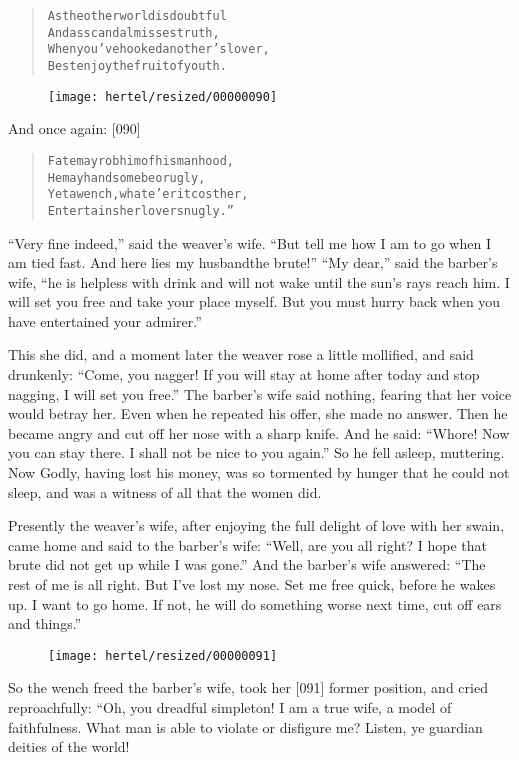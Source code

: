 \documentclass[article, twoside, 10pt]{memoir}
\renewenvironment{verbatim}{%
\begin{quote}%
\vskip -10pt%
\begin{alltt}\normalfont\small}{\end{alltt}%
\end{quote}%
\vskip -10pt
} %
\begin{document}
\begin{verbatim}
As the other world is doubtful
    And as scandal misses truth,
When you've hooked another's lover,
    Best enjoy the fruit of youth.
\end{verbatim}
\begin{figure}[p]\texttt{[image: hertel/resized/00000090]}\end{figure}And once again: [090]

\begin{verbatim}
Fate may rob him of his manhood,
He may handsome be or ugly,
Yet a wench, whate'er it cost her,
Entertains her lover snugly.”
\end{verbatim}
``Very fine indeed,'' said the weaver's wife.
``But tell me how I am to go when I am tied fast. And here lies my husband{\textemdash}the brute!''
``My dear,'' said the barber's wife,
``he is helpless with drink and will not wake until the sun's rays reach him. I will set you free and take your place myself. But you must hurry back when you have entertained your admirer.''

This she did, and a moment later the weaver rose a little
mollified, and said drunkenly:
``Come, you nagger! If you will stay at home after today and stop nagging, I will set you free.''
The barber's wife said nothing, fearing that her voice would betray
her. Even when he repeated his offer, she made no answer. Then he
became angry and cut off her nose with a sharp knife. And he said:
``Whore! Now you can stay there. I shall not be nice to you again.''
So he fell asleep, muttering. Now Godly, having lost his money, was
so tormented by hunger that he could not sleep, and was a witness
of all that the women did.

Presently the weaver's wife, after enjoying the full delight of
love with her swain, came home and said to the barber's wife:
``Well, are you all right? I hope that brute did not get up while I was gone.''
And the barber's wife answered:
``The rest of me is all right. But I've lost my nose. Set me free quick, before he wakes up. I want to go home. If not, he will do something worse next time, cut off ears and things.''

\begin{figure}[p]\texttt{[image: hertel/resized/00000091]}\end{figure}So the wench freed the barber's wife, took her [091] former
position, and cried reproachfully: “Oh, you dreadful simpleton! I
am a true wife, a model of faithfulness. What man is able to
violate or disfigure me? Listen, ye guardian deities of the world!
\end{document}
